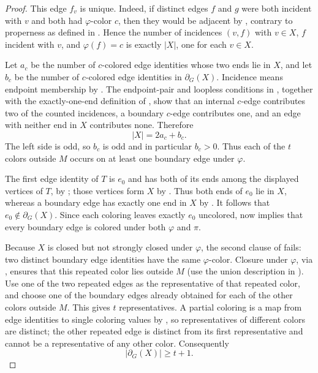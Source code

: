 \begin{proof}
This edge $f_v$ is unique.  Indeed, if distinct edges $f$ and $g$ were
both incident with $v$ and both had $\varphi$-color $c$, then they would be
adjacent by , contrary to properness as defined in
.  Hence the number of incidences
$(v,f)$ with $v\in X$, $f$ incident with $v$, and $\varphi(f)=c$ is
exactly $|X|$, one for each $v\in X$.

Let $a_c$ be the number of $c$-colored edge identities whose two ends lie
in $X$, and let $b_c$ be the number of $c$-colored edge identities in
$\partial_G(X)$.  Incidence means endpoint membership by
.  The endpoint-pair and loopless conditions in
, together with the exactly-one-end definition
of , show that an internal $c$-edge contributes two
of the counted incidences, a boundary $c$-edge contributes one, and an
edge with neither end in $X$ contributes none.  Therefore
\[
                         |X|=2a_c+b_c.
\]
The left side is odd, so $b_c$ is odd and in particular $b_c>0$.
Thus each of the $t$ colors outside $M$ occurs on at least one boundary
edge under $\varphi$.

The first edge identity of $T$ is $e_0$ and has both of its ends among the
displayed vertices of $T$, by ; those vertices form
$X$ by .  Thus both ends of $e_0$ lie in
$X$, whereas a boundary edge has exactly one end in $X$ by
.  It follows that $e_0\notin\partial_G(X)$.
Since each coloring leaves exactly $e_0$ uncolored,
 now implies that every boundary edge is
colored under both $\varphi$ and $\pi$.

Because $X$ is closed but not strongly closed under $\varphi$, the second
clause of  fails: two distinct
boundary edge identities have the same $\varphi$-color.  Closure under
$\varphi$, via , ensures that this repeated
color lies outside $M$ (use the union description in
).  Use one of the two repeated edges as the
representative of that repeated color, and choose one of the boundary edges
already obtained for each of the other colors outside $M$.  This gives $t$
representatives.  A partial
coloring is a map from edge identities to single coloring values by
, so representatives of different colors are
distinct; the other repeated edge is distinct from its first representative
and cannot be a representative of any other color.  Consequently
\[
                         |\partial_G(X)|\geq t+1.       \tag{1}
\]


\end{proof}
